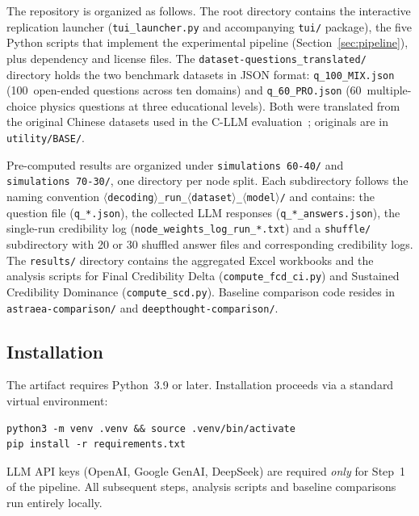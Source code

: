 The repository is organized as follows. The root directory contains the interactive replication launcher (\texttt{tui\_launcher.py} and accompanying \texttt{tui/} package), the five Python scripts that implement the experimental pipeline (Section~\ref{sec:pipeline}), plus dependency and license files. The \texttt{dataset-questions\_translated/} directory holds the two benchmark datasets in JSON format: \texttt{q\_100\_MIX.json} (100~open-ended questions across ten domains) and \texttt{q\_60\_PRO.json} (60~multiple-choice physics questions at three educational levels). Both were translated from the original Chinese datasets used in the C-LLM evaluation~\cite{xian2024cllm}; originals are in \texttt{utility/BASE/}.

Pre-computed results are organized under \texttt{simulations~60-40/} and \texttt{simulations~70-30/}, one directory per node split. Each subdirectory follows the naming convention \texttt{$\langle$decoding$\rangle$\_run\_$\langle$dataset$\rangle$\_$\langle$model$\rangle$/} and contains: the question file (\texttt{q\_*.json}), the collected LLM responses (\texttt{q\_*\_answers.json}), the single-run credibility log (\texttt{node\_weights\_log\_run\_*.txt}) and a \texttt{shuffle/} subdirectory with 20 or 30 shuffled answer files and corresponding credibility logs. The \texttt{results/} directory contains the aggregated Excel workbooks and the analysis scripts for Final Credibility Delta (\texttt{compute\_fcd\_ci.py}) and Sustained Credibility Dominance (\texttt{compute\_scd.py}). Baseline comparison code resides in \texttt{astraea-comparison/} and \texttt{deepthought-comparison/}.

\subsection{Installation}
\label{sec:installation}

The artifact requires Python~3.9 or later. Installation proceeds via a standard virtual environment:

\begin{lstlisting}[style=shell]
python3 -m venv .venv && source .venv/bin/activate
pip install -r requirements.txt
\end{lstlisting}

\noindent LLM API keys (OpenAI, Google GenAI, DeepSeek) are required \emph{only} for Step~1 of the pipeline. All subsequent steps, analysis scripts and baseline comparisons run entirely locally.
